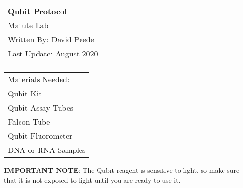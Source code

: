\documentclass[a4paper,12pt]{article}
\begin{document}
\thispagestyle{empty} 

\begin{tabular}{p{15.5cm}} %
{\large \bf Qubit Protocol} \\
Matute Lab \\ Written By: David Peede  \\ Last Update: August 2020\\
\hline %
\\
\end{tabular} %

\vspace*{0.3cm} %

\begin{tabular}{p{15.5cm}} %
	{\Large Materials Needed:} 
	\vspace{2mm}
	\\ {Qubit Kit} \\ {Qubit Assay Tubes}\\ {Falcon Tube} \\ {Qubit Fluorometer} \\ {DNA or RNA Samples} 
		
\end{tabular}

\vspace{0.4cm}

\textbf{IMPORTANT NOTE}: The Qubit reagent is sensitive to light, so make sure that it is not exposed to light until you are ready to use it. 
\end{document}

